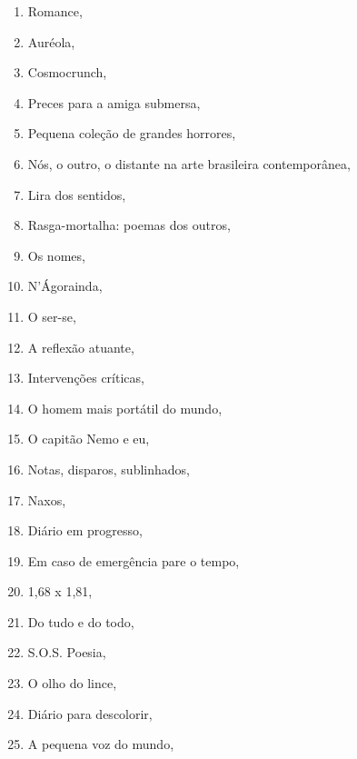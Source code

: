 \begin{multicols}{2}
\begin{enumerate}
\item Romance, {}
\item Auréola, {}
\item Cosmocrunch, {}
\item Preces para a amiga submersa, {}
\item Pequena coleção de grandes horrores, {}
\item Nós, o outro, o distante na arte brasileira contemporânea, {}
\item Lira dos sentidos, {}
\item Rasga-mortalha: poemas dos outros, {}
\item Os nomes, {}
\item N’Ágorainda, {}
\item O ser-se, {}
\item A reflexão atuante, {}
\item Intervenções críticas, {}
\item O homem mais portátil do mundo, {}
\item O capitão Nemo e eu, {}
\item Notas, disparos, sublinhados, {}
\item Naxos, {}
\item Diário em progresso, {}
\item Em caso de emergência pare o tempo, {}
\item 1,68 x 1,81, {}
\item Do tudo e do todo, {}
\item S.O.S. Poesia, {}
\item O olho do lince, {}
\item Diário para descolorir, {}
\item A pequena voz do mundo, {}

\end{enumerate}
\end{multicols}
